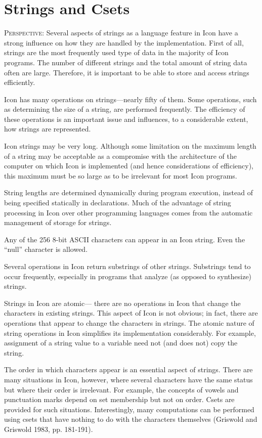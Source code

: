 \chapter{Strings and Csets}
\label{SC-Chapter}

\textsc{Perspective}: Several aspects of strings as a language feature
in Icon have a strong influence on how they are handled by the
implementation. First of all, strings are the most frequently used
type of data in the majority of Icon programs. The number of different
strings and the total amount of string data often are
large. Therefore, it is important to be able to store and access
strings efficiently.

Icon has many operations on strings{---}nearly fifty of them. Some
operations, such as determining the size of a string, are performed
frequently. The efficiency of these operations is an important issue
and influences, to a considerable extent, how strings are represented.

Icon strings may be very long. Although some limitation on the maximum
length of a string may be acceptable as a compromise with the
architecture of the computer on which Icon is implemented (and hence
considerations of efficiency), this maximum must be so large as to be
irrelevant for most Icon programs.

String lengths are determined dynamically during program execution,
instead of being specified statically in declarations. Much of the
advantage of string processing in Icon over other programming
languages comes from the automatic management of storage for strings.

Any of the 256 8-bit ASCII characters can appear in an Icon
string. Even the ``null'' character is allowed.

Several operations in Icon return substrings of other
strings. Substrings tend to occur frequently, especially in programs
that analyze (as opposed to synthesize) strings.


Strings in Icon are atomic{---} there are no operations in Icon that
change the characters in existing strings. This aspect of Icon is not
obvious; in fact, there are operations that appear to change the
characters in strings. The atomic nature of string operations in Icon
simplifies its implementation considerably. For example, assignment of
a string value to a variable need not (and does not) copy the string.

The order in which characters appear is an essential aspect of
strings. There are many situations in Icon, however, where several
characters have the same status but where their order is
irrelevant. For example, the concepts of vowels and punctuation marks
depend on set membership but not on order. Csets are provided for such
situations. Interestingly, many computations can be performed using
csets that have nothing to do with the characters themselves (Griswold
and Griswold 1983, pp. 181-191).



